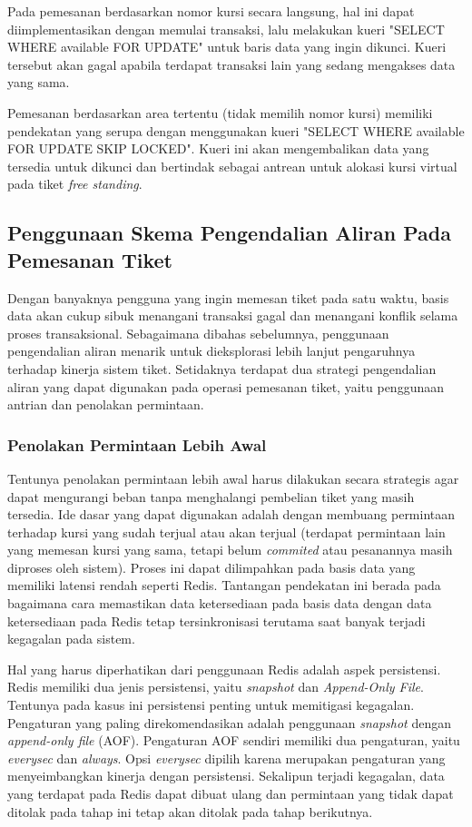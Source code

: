 Pada pemesanan berdasarkan nomor kursi secara langsung, hal ini dapat diimplementasikan dengan memulai transaksi, lalu melakukan kueri "SELECT WHERE available FOR UPDATE" untuk baris data yang ingin dikunci. Kueri tersebut akan gagal apabila terdapat transaksi lain yang sedang mengakses data yang sama.

Pemesanan berdasarkan area tertentu (tidak memilih nomor kursi) memiliki pendekatan yang serupa dengan menggunakan kueri "SELECT WHERE available FOR UPDATE SKIP LOCKED". Kueri ini akan mengembalikan data yang tersedia untuk dikunci dan bertindak sebagai antrean untuk alokasi kursi virtual pada tiket \textit{free standing}.

\subsection{Penggunaan Skema Pengendalian Aliran Pada Pemesanan Tiket}

Dengan banyaknya pengguna yang ingin memesan tiket pada satu waktu, basis data akan cukup sibuk menangani transaksi gagal dan menangani konflik selama proses transaksional. Sebagaimana dibahas sebelumnya, penggunaan pengendalian aliran menarik untuk dieksplorasi lebih lanjut pengaruhnya terhadap kinerja sistem tiket. Setidaknya terdapat dua strategi pengendalian aliran yang dapat digunakan pada operasi pemesanan tiket, yaitu penggunaan antrian dan penolakan permintaan.

\subsubsection{Penolakan Permintaan Lebih Awal}

Tentunya penolakan permintaan lebih awal harus dilakukan secara strategis agar dapat mengurangi beban tanpa menghalangi pembelian tiket yang masih tersedia. Ide dasar yang dapat digunakan adalah dengan membuang permintaan terhadap kursi yang sudah terjual atau akan terjual (terdapat permintaan lain yang memesan kursi yang sama, tetapi belum \textit{commited} atau pesanannya masih diproses oleh sistem). Proses ini dapat dilimpahkan pada basis data yang memiliki latensi rendah seperti Redis. Tantangan pendekatan ini berada pada bagaimana cara memastikan data ketersediaan pada basis data dengan data ketersediaan pada Redis tetap tersinkronisasi terutama saat banyak terjadi kegagalan pada sistem.

Hal yang harus diperhatikan dari penggunaan Redis adalah aspek persistensi. Redis memiliki dua jenis persistensi, yaitu \textit{snapshot} dan \textit{Append-Only File}. Tentunya pada kasus ini persistensi penting untuk memitigasi kegagalan. Pengaturan yang paling direkomendasikan adalah penggunaan \textit{snapshot} dengan \textit{append-only file} (AOF). Pengaturan AOF sendiri memiliki dua pengaturan, yaitu \textit{everysec} dan \textit{always}. Opsi \textit{everysec} dipilih karena merupakan pengaturan yang menyeimbangkan kinerja dengan persistensi. Sekalipun terjadi kegagalan, data yang terdapat pada Redis dapat dibuat ulang dan permintaan yang tidak dapat ditolak pada tahap ini tetap akan ditolak pada tahap berikutnya.

